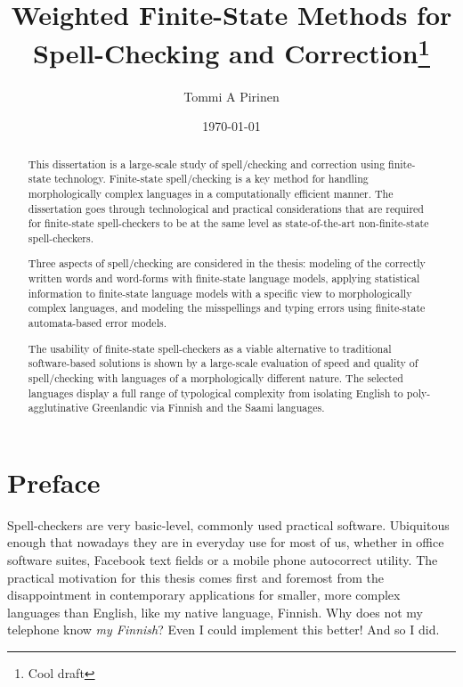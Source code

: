 \documentclass[officiallayout]{unihelcompling}
\title{Weighted Finite-State Methods for 
Spell-Checking
and Correction\footnote{Cool draft}}
\author{Tommi A Pirinen}
\date{\today}
\begin{document}
\frontmatter

\maketitle

\begin{abstract} 
    This dissertation is a large-scale study of spell\-/checking and correction
    using finite-state technology. Finite-state spell\-/checking is a key method
    for handling morphologically complex languages in a computationally
    efficient manner. The dissertation goes through technological and practical
    considerations that are required for finite-state spell-checkers to be at
    the same level as state-of-the-art non-finite-state spell-checkers. 

    Three aspects of spell\-/checking are considered in the thesis: modeling of
    the correctly written words and word-forms with finite-state language
    models, applying statistical information to finite-state language models
    with a specific view to morphologically complex languages, and modeling the
    misspellings and typing errors using finite-state automata-based error
    models.

    The usability of finite-state spell-checkers as a viable alternative to
    traditional software-based solutions is shown by a large-scale
    evaluation of speed and quality of spell\-/checking with languages of
    a morphologically different nature. The selected languages display a
    full range of typological complexity from isolating English to 
    poly-agglutinative Greenlandic via Finnish and the Saami languages.
\end{abstract}

\mainmatter

\chapter*{Preface}
\label{chap:preface}

Spell-checkers are very basic-level, commonly used practical software.
Ubi\-quitous enough that nowadays they are in everyday use for most of us,
whether in office software suites, Facebook text fields or a mobile
phone autocorrect utility. The practical motivation for this thesis comes
first and foremost from the disappointment in contemporary applications for
smaller, more complex languages than English, like my native language, Finnish.
Why does not my telephone know \emph{my Finnish}? Even I could implement this
better! And so I did.
\end{document}
